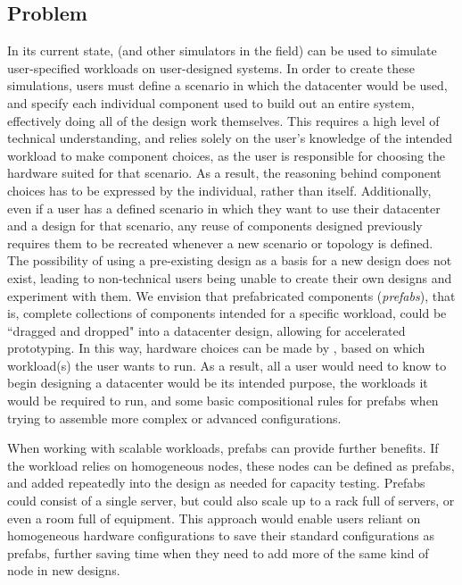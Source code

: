 \documentclass[11pt]{article}
\begin{document}
	\subsection{Problem}
		In its current state, \opendc{} (and other simulators in the field) can be used to simulate user-specified workloads on user-designed systems. 
		In order to create these simulations, users must define a scenario in which the datacenter would be used, and specify each individual component used to build out an entire system, effectively doing all of the design work themselves. 
		This requires a high level of technical understanding, and relies solely on the user's knowledge of the intended workload to make component choices, as the user is responsible for choosing the hardware suited for that scenario. 
		As a result, the reasoning behind component choices has to be expressed by the individual, rather than \opendc{} itself.  
		Additionally, even if a user has a defined scenario in which they want to use their datacenter and a design for that scenario, any reuse of components designed previously requires them to be recreated whenever a new scenario or topology is defined.
		The possibility of using a pre-existing design as a basis for a new design does not exist, leading to non-technical users being unable to create their own designs and experiment with them. 
		We envision that prefabricated components (\textit{prefabs}), that is, complete collections of components intended for a specific workload, could be ``dragged and dropped" into a datacenter design, allowing for accelerated prototyping.
		In this way, hardware choices can be made by \opendc{}, based on which workload(s) the user wants to run.
		As a result, all a user would need to know to begin designing a datacenter would be its intended purpose, the workloads it would be required to run, and some basic compositional rules for prefabs when trying to assemble more complex or advanced configurations.

		When working with scalable workloads, prefabs can provide further benefits.
		If the workload relies on homogeneous nodes, these nodes can be defined as prefabs, and added repeatedly into the design as needed for capacity testing.
		Prefabs could consist of a single server, but could also scale up to a rack full of servers, or even a room full of equipment.
		This approach would enable users reliant on homogeneous hardware configurations to save their standard configurations as prefabs, further saving time when they need to add more of the same kind of node in new designs.
	
\end{document}

